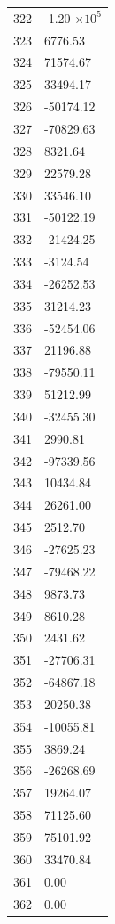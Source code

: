 \documentclass[a4paper,11pt]{article}
\begin{document}
\begin{center}
\begin{longtable}{|R{1.5cm}|R{2.5cm}|}
  322 &        -1.20 $\times 10^{           5}$ \\
  323 &      6776.53 \\
  324 &     71574.67 \\
  325 &     33494.17 \\
  326 &    -50174.12 \\
  327 &    -70829.63 \\
  328 &      8321.64 \\
  329 &     22579.28 \\
  330 &     33546.10 \\
  331 &    -50122.19 \\
  332 &    -21424.25 \\
  333 &     -3124.54 \\
  334 &    -26252.53 \\
  335 &     31214.23 \\
  336 &    -52454.06 \\
  337 &     21196.88 \\
  338 &    -79550.11 \\
  339 &     51212.99 \\
  340 &    -32455.30 \\
  341 &      2990.81 \\
  342 &    -97339.56 \\
  343 &     10434.84 \\
  344 &     26261.00 \\
  345 &      2512.70 \\
  346 &    -27625.23 \\
  347 &    -79468.22 \\
  348 &      9873.73 \\
  349 &      8610.28 \\
  350 &      2431.62 \\
  351 &    -27706.31 \\
  352 &    -64867.18 \\
  353 &     20250.38 \\
  354 &    -10055.81 \\
  355 &      3869.24 \\
  356 &    -26268.69 \\
  357 &     19264.07 \\
  358 &     71125.60 \\
  359 &     75101.92 \\
  360 &     33470.84 \\
  361 &         0.00 \\
  362 &         0.00 \\

\end{longtable}
\end{center}
\end{document}
